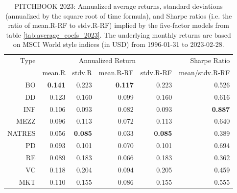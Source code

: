 \documentclass[12pt]{article}
\begin{document}
\begin{table}[ht]
	\centering
	\begin{tabular}{rrrrrr}
		Type & \multicolumn{4}{c}{Annualized Return} & Sharpe Ratio \\ 
		\cmidrule(r){2-5}
		& mean.R & stdv.R & mean.R-RF & stdv.R-RF & mean/stdv.R-RF \\ 
		\hline
		\hline
		BO & \textbf{0.141} & 0.223 & \textbf{0.117} & 0.223 & 0.526 \\ 
		DD & 0.123 & 0.160 & 0.099 & 0.160 & 0.616 \\ 
		INF & 0.106 & 0.093 & 0.082 & 0.093 & \textbf{0.887} \\ 
		MEZZ & 0.096 & 0.113 & 0.072 & 0.113 & 0.640 \\ 
		NATRES & 0.056 & \textbf{0.085} & 0.033 & \textbf{0.085} & 0.389 \\ 
		PD & 0.093 & 0.101 & 0.070 & 0.101 & 0.694 \\ 
		RE & 0.089 & 0.183 & 0.066 & 0.183 & 0.362 \\ 
		VC & 0.118 & 0.204 & 0.094 & 0.205 & 0.459 \\ 
		\hline
		MKT & 0.110 & 0.155 & 0.086 & 0.155 & 0.555 \\ 
		\hline
		\hline
	\end{tabular}
	\caption{
		PITCHBOOK 2023: 
		Annualized average returns, standard deviations (annualized by the square root of time formula), and Sharpe ratios (i.e. the ratio of mean.R-RF to stdv.R-RF) implied by the five-factor models from table \ref{tab:average_coefs_2023}.
		The underlying monthly returns are based on MSCI World style indices (in USD) from 1996-01-31 to 2023-02-28.} 
	\label{tab:ann_returns_2023}
\end{table}
\end{document}
